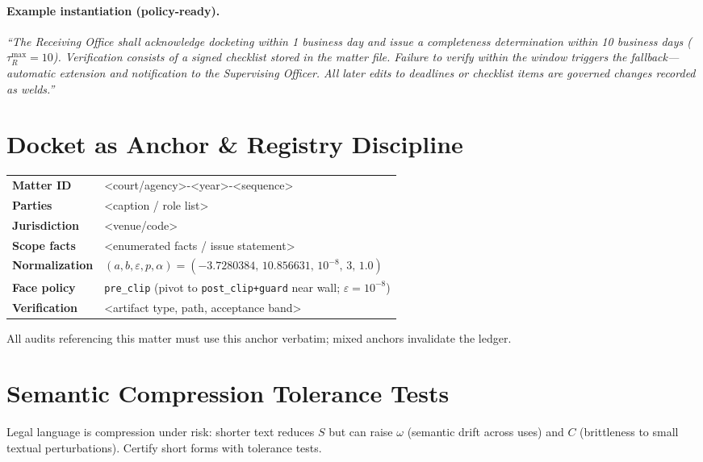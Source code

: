 \paragraph{Example instantiation (policy-ready).}
\emph{“The Receiving Office shall acknowledge docketing within 1 business day and issue a completeness determination within 10 business days (\(\tau_R^{\max}=10\)). Verification consists of a signed checklist stored in the matter file. Failure to verify within the window triggers the fallback—automatic extension and notification to the Supervising Officer. All later edits to deadlines or checklist items are governed changes recorded as welds.”}

\section{Docket as Anchor \& Registry Discipline}
\label{sec:legal-anchor}

\begin{eqbox}
\small
\begin{tabularx}{\linewidth}{@{}>{\bfseries}l X@{}}
Matter ID      & <court/agency>-<year>-<sequence> \\
Parties        & <caption / role list> \\
Jurisdiction   & <venue/code> \\
Scope facts    & <enumerated facts / issue statement> \\
Normalization  & $(a,b,\varepsilon,p,\alpha)=(-3.7280384,\,10.856631,\,10^{-8},\,3,\,1.0)$ \\
Face policy    & \texttt{pre\_clip} (pivot to \texttt{post\_clip+guard} near wall; $\varepsilon=10^{-8}$) \\
Verification   & <artifact type, path, acceptance band> \\
\end{tabularx}

\vspace{0.2\baselineskip}
\raggedright\footnotesize
All audits referencing this matter must use this anchor verbatim; mixed anchors invalidate the ledger.
\end{eqbox}


\section{Semantic Compression Tolerance Tests}
\label{sec:legal-compression}

Legal language is compression under risk: shorter text reduces \(S\) but can raise \(\omega\) (semantic drift across uses) and \(C\) (brittleness to small textual perturbations). Certify short forms with tolerance tests.

